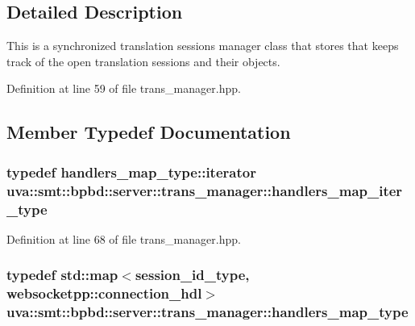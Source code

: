 \subsection{Detailed Description}
This is a synchronized translation sessions manager class that stores that keeps track of the open translation sessions and their objects. 

Definition at line 59 of file trans\+\_\+manager.\+hpp.



\subsection{Member Typedef Documentation}
\hypertarget{classuva_1_1smt_1_1bpbd_1_1server_1_1trans__manager_adec62cec51f0ade28dbf9311b3a3b4ad}{}
\subsubsection[{handlers\+\_\+map\+\_\+iter\+\_\+type}]{\setlength{\rightskip}{0pt plus 5cm}typedef handlers\+\_\+map\+\_\+type\+::iterator {\bf uva\+::smt\+::bpbd\+::server\+::trans\+\_\+manager\+::handlers\+\_\+map\+\_\+iter\+\_\+type}}\label{classuva_1_1smt_1_1bpbd_1_1server_1_1trans__manager_adec62cec51f0ade28dbf9311b3a3b4ad}


Definition at line 68 of file trans\+\_\+manager.\+hpp.

\hypertarget{classuva_1_1smt_1_1bpbd_1_1server_1_1trans__manager_ad5d869b7da9455a2903c5682dde5bcfe}{}
\subsubsection[{handlers\+\_\+map\+\_\+type}]{\setlength{\rightskip}{0pt plus 5cm}typedef std\+::map$<${\bf session\+\_\+id\+\_\+type}, websocketpp\+::connection\+\_\+hdl$>$ {\bf uva\+::smt\+::bpbd\+::server\+::trans\+\_\+manager\+::handlers\+\_\+map\+\_\+type}}\label{classuva_1_1smt_1_1bpbd_1_1server_1_1trans__manager_ad5d869b7da9455a2903c5682dde5bcfe}


